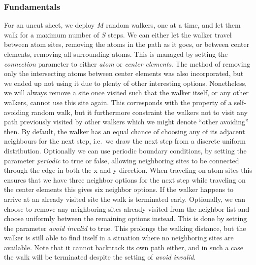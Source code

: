 \subsubsection{Fundamentals} %
For an uncut sheet, we deploy $M$ random walkers, one at a time, and let them walk
for a maximum number of $S$ steps. We can either let the walker travel between
atom sites, removing the atoms in the path as it goes, or between center
elements, removing all surrounding atoms. This is managed by setting the \textit{connection} parameter to either \textit{atom} or \textit{center elements}. The method of removing only the intersecting atoms between center elements was also incorporated, but we ended up not using it due to plenty of other interesting options. Nonetheless, we will always remove a site once visited such that the
walker itself, or any other walkers, cannot use this site again. This corresponds
with the property of a self-avoiding random walk, but it furthermore constraint
the walkers not to visit any path previously visited by other walkers which we might denote ``other avoiding'' then. By default, the walker has an equal chance of choosing any of its adjacent
neighbours for the next step, i.e.\ we draw the next step from a discrete
uniform distribution. Optionally we can use periodic boundary conditions, by setting the parameter \textit{periodic} to true or false, allowing neighboring sites to be connected
through the edge in both the x and y-direction. When traveling on atom sites
this ensures that we have three neighbor options for the next step while traveling on the
center elements this gives six neighbor options. If the walker happens to arrive at
an already visited site the walk is terminated early. Optionally, we can choose
to remove any neighboring sites already visited from the neighbor list and choose uniformly between the remaining options instead. This is done by setting the parameter \textit{avoid invalid} to true. This prolongs the walking distance, but the walker is still able to find itself in a situation where no neighboring sites are
available. Note that it cannot backtrack its own path either, and in such a case
the walk will be terminated despite the setting of \textit{avoid invalid}.


